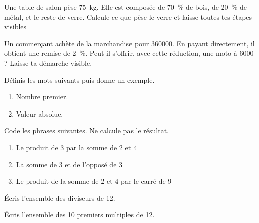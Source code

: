 \documentclass[parskip=half-,DIV=12,twoside=semi, 12pt]{scrartcl}
\begin{document}
\newpage
\begin{transferer}[points=2]
    Une table de salon pèse \SI{75}{kg}. Elle est composée de \SI{70}{\%} de bois, de \SI[]{20}{\%} de métal, et le reste de verre. Calcule ce que pèse le verre et laisse toutes tes
    étapes visibles
    \vspace{5cm}
\end{transferer}
\begin{transferer}[points=2]
    Un commerçant achète de la marchandise pour \SI{360000}{\sieuro}. En payant directement, il obtient une remise de \SI[]{2}{\%}. Peut-il s'offrir, avec cette réduction, une moto à \SI{6000}{\sieuro} ? Laisse ta démarche visible.
    \vspace{5cm}
\end{transferer}
\begin{connaitre}[points=3]
    Définis les mots suivants puis donne un exemple.
    \begin{enumerate}[itemsep=\fill, after=\vfill]
        \item Nombre premier.
        \item Valeur absolue.
    \end{enumerate}
\end{connaitre}
\newpage
\begin{connaitre}[points=3]
    Code les phrases suivantes. Ne calcule pas le résultat.
    \begin{enumerate}[itemsep=1.5cm]
        \item Le produit de 3 par la somme de 2 et 4
        \item La somme de 3 et de l'opposé de 3
        \item Le produit de la somme de 2 et 4 par le carré de 9
    \end{enumerate}
    \vspace{1.5cm}
\end{connaitre}
\begin{connaitre}[points=1]
    Écris l'ensemble des diviseurs de 12.
    \vspace{2cm}
\end{connaitre}
\begin{connaitre}[points=1]
    Écris l'ensemble des 10 premiers multiples de 12.
    \vspace{2cm}
\end{connaitre}
\end{document}
